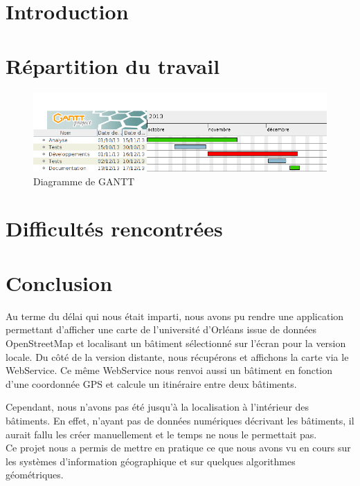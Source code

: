 \documentclass[12pt,a4paper,oneside]{article}
\begin{document}
\newpage

\tableofcontents
\newpage

\section{Introduction}



\section{Répartition du travail}


\begin{figure}[H]

\centering
\includegraphics[width=1\textwidth]{../images/gantt.png}
\caption{Diagramme de GANTT}

\end{figure}

\section{Difficultés rencontrées}



\section{Conclusion}

Au terme du délai qui nous était imparti, nous avons pu rendre une application permettant
d'afficher une carte de l'université d'Orléans issue de données OpenStreetMap et localisant
un bâtiment sélectionné sur l'écran pour la version locale.
Du côté de la version distante, nous récupérons et affichons la carte via le WebService.
Ce même WebService nous renvoi aussi un bâtiment en fonction d'une coordonnée GPS et
calcule un itinéraire entre deux bâtiments.

Cependant, nous n'avons pas été jusqu'à la localisation à l'intérieur des bâtiments.
En effet, n'ayant pas de données numériques décrivant les bâtiments,
il aurait fallu les créer manuellement et le temps ne nous le permettait pas.
\\

Ce projet nous a permis de mettre en pratique ce que nous avons vu en cours sur les systèmes
d'information géographique et sur quelques algorithmes géométriques.


\appendix
\end{document}
